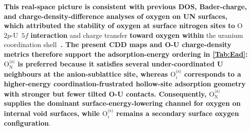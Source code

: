 \documentclass[preprint,12pt,sort&compress]{elsarticle}
\newcommand{\?}{\stackrel{?}{=}}
\providecommand{\DIFaddtex}[1]{{\bf #1}} %
\providecommand{\DIFdeltex}[1]{} %
\providecommand{\DIFaddbegin}{\protect\color{blue}} %
\providecommand{\DIFaddend}{\protect\color{black}} %
\providecommand{\DIFdelbegin}{\protect\color{red}} %
\providecommand{\DIFdelend}{\protect\color{black}} %
\providecommand{\DIFadd}[1]{\texorpdfstring{\DIFaddtex{#1}}{#1}} %
\providecommand{\DIFdel}[1]{\texorpdfstring{\DIFdeltex{#1}}{}} %
\begin{document}
\DIFadd{This real-space picture is consistent with previous DOS, Bader-charge, and charge-density-difference analyses of oxygen on UN surfaces, which attributed the stability of oxygen at surface nitrogen sites to }\DIFaddend O~$2p$-U~$5f$ \DIFdelbegin \DIFdel{hybridization }\DIFdelend \DIFaddbegin \DIFadd{interaction }\DIFaddend and charge transfer \DIFdelbegin \DIFdel{enabled by }\DIFdelend \DIFaddbegin \DIFadd{toward oxygen within }\DIFaddend the uranium coordination shell\DIFdelbegin \DIFdel{at nitrogen sublattice sites is the electronic origin of the stronger adsorption of $\mathrm{O_N^{(s)}}$ and, consequently, its dominant role in reducing the surface energy of voids in UN}\DIFdelend \DIFaddbegin \DIFadd{~\cite{Bocharov2011JNM,Zhukovskii2009SS,Zhukovskii2009JNM}. The present CDD maps and O-U charge-density metrics therefore support the adsorption-energy ordering in \cref{Tab:Ead}: $\mathrm{O}_{\mathrm{N}}^{\text{(s)}}$ is preferred because it satisfies several under-coordinated U neighbours at the anion-sublattice site, whereas $\mathrm{O}_i^{\text{(s)}}$ corresponds to a higher-energy coordination-frustrated hollow-site adsorption geometry with stronger but fewer tilted O-U contacts. Consequently, $\mathrm{O}_{\mathrm{N}}^{\text{(s)}}$ supplies the dominant surface-energy-lowering channel for oxygen on internal void surfaces, while $\mathrm{O}_i^{\text{(s)}}$ remains a secondary surface oxygen configuration}\DIFaddend .
\end{document}
